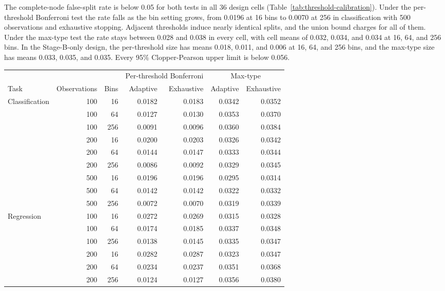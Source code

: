 \documentclass[11pt]{article}
\begin{document}
The complete-node false-split rate is below 0.05 for both tests in all 36
design cells (Table~\ref{tab:threshold-calibration}). Under the per-threshold
Bonferroni test the rate falls as the bin setting grows, from 0.0196 at 16
bins to 0.0070 at 256 in classification with 500 observations and exhaustive
stopping. Adjacent thresholds induce nearly identical splits, and the union
bound charges for all of them. Under the max-type test the rate stays between
0.028 and 0.038 in every cell, with cell means of 0.032, 0.034, and 0.034 at
16, 64, and 256 bins. In the Stage-B-only design, the per-threshold size has
means 0.018, 0.011, and 0.006 at 16, 64, and 256 bins, and the max-type size
has means 0.033, 0.035, and 0.035. Every 95\% Clopper-Pearson upper limit is
below 0.056.

\begin{table}[t!]
\centering
\small
\begin{tabular}{lrrrrrr}
\toprule
 & & & \multicolumn{2}{c}{Per-threshold Bonferroni} & \multicolumn{2}{c}{Max-type} \\
\cmidrule(lr){4-5} \cmidrule(l){6-7}
Task & Observations & Bins & Adaptive & Exhaustive & Adaptive & Exhaustive \\ \midrule
Classification & 100 & 16 & 0.0182 & 0.0183 & 0.0342 & 0.0352 \\
 & 100 & 64 & 0.0127 & 0.0130 & 0.0353 & 0.0370 \\
 & 100 & 256 & 0.0091 & 0.0096 & 0.0360 & 0.0384 \\
 & 200 & 16 & 0.0200 & 0.0203 & 0.0326 & 0.0342 \\
 & 200 & 64 & 0.0144 & 0.0147 & 0.0333 & 0.0344 \\
 & 200 & 256 & 0.0086 & 0.0092 & 0.0329 & 0.0345 \\
 & 500 & 16 & 0.0196 & 0.0196 & 0.0295 & 0.0314 \\
 & 500 & 64 & 0.0142 & 0.0142 & 0.0322 & 0.0332 \\
 & 500 & 256 & 0.0072 & 0.0070 & 0.0319 & 0.0339 \\
Regression & 100 & 16 & 0.0272 & 0.0269 & 0.0315 & 0.0328 \\
 & 100 & 64 & 0.0174 & 0.0185 & 0.0337 & 0.0348 \\
 & 100 & 256 & 0.0138 & 0.0145 & 0.0335 & 0.0347 \\
 & 200 & 16 & 0.0282 & 0.0287 & 0.0323 & 0.0347 \\
 & 200 & 64 & 0.0234 & 0.0237 & 0.0351 & 0.0368 \\
 & 200 & 256 & 0.0124 & 0.0127 & 0.0356 & 0.0380 \\

\end{tabular}
\end{table}
\end{document}
